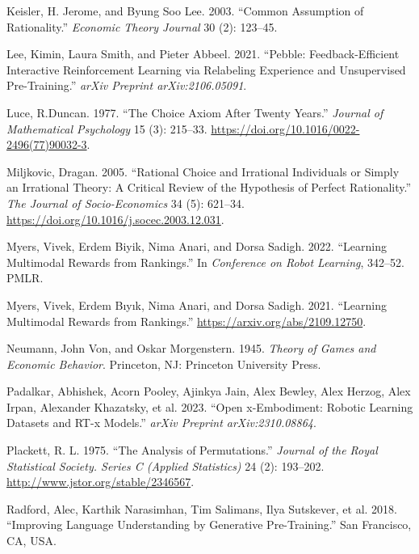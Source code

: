 \documentclass[
  letterpaper,
  numbers=noenddot,
  DIV=11,
  oneside]{scrreprt}
\newlength{\cslhangindent}
\newenvironment{CSLReferences}[2] %
 {\begin{list}{}{%
  \setlength{\itemindent}{0pt}
  \setlength{\leftmargin}{0pt}
  \setlength{\parsep}{0pt}
  \ifodd #1
   \setlength{\leftmargin}{\cslhangindent}
   \setlength{\itemindent}{-1\cslhangindent}
  \fi
  \setlength{\itemsep}{#2\baselineskip}}}
 {\end{list}}
\theoremstyle{remark}
\begin{document}
\begin{CSLReferences}{1}{0}
Keisler, H. Jerome, and Byung Soo Lee. 2003. {``Common Assumption of
Rationality.''} \emph{Economic Theory Journal} 30 (2): 123--45.

Lee, Kimin, Laura Smith, and Pieter Abbeel. 2021. {``Pebble:
Feedback-Efficient Interactive Reinforcement Learning via Relabeling
Experience and Unsupervised Pre-Training.''} \emph{arXiv Preprint
arXiv:2106.05091}.

Luce, R.Duncan. 1977. {``The Choice Axiom After Twenty Years.''}
\emph{Journal of Mathematical Psychology} 15 (3): 215--33.
\url{https://doi.org/10.1016/0022-2496(77)90032-3}.

Miljkovic, Dragan. 2005. {``Rational Choice and Irrational Individuals
or Simply an Irrational Theory: A Critical Review of the Hypothesis of
Perfect Rationality.''} \emph{The Journal of Socio-Economics} 34 (5):
621--34. \url{https://doi.org/10.1016/j.socec.2003.12.031}.

Myers, Vivek, Erdem Biyik, Nima Anari, and Dorsa Sadigh. 2022.
{``Learning Multimodal Rewards from Rankings.''} In \emph{Conference on
Robot Learning}, 342--52. PMLR.

Myers, Vivek, Erdem Bıyık, Nima Anari, and Dorsa Sadigh. 2021.
{``Learning Multimodal Rewards from Rankings.''}
\url{https://arxiv.org/abs/2109.12750}.

Neumann, John Von, and Oskar Morgenstern. 1945. \emph{Theory of Games
and Economic Behavior}. Princeton, NJ: Princeton University Press.

Padalkar, Abhishek, Acorn Pooley, Ajinkya Jain, Alex Bewley, Alex
Herzog, Alex Irpan, Alexander Khazatsky, et al. 2023. {``Open
x-Embodiment: Robotic Learning Datasets and RT-x Models.''} \emph{arXiv
Preprint arXiv:2310.08864}.

Plackett, R. L. 1975. {``The Analysis of Permutations.''} \emph{Journal
of the Royal Statistical Society. Series C (Applied Statistics)} 24 (2):
193--202. \url{http://www.jstor.org/stable/2346567}.

Radford, Alec, Karthik Narasimhan, Tim Salimans, Ilya Sutskever, et al.
2018. {``Improving Language Understanding by Generative Pre-Training.''}
San Francisco, CA, USA.


\end{CSLReferences}
\end{document}
